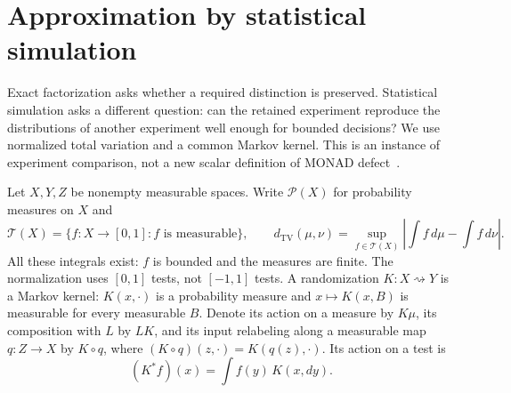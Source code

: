 \section{Approximation by statistical simulation}
\label{sec:simulation}

Exact factorization asks whether a required distinction is preserved.
Statistical simulation asks a different question: can the retained
experiment reproduce the distributions of another experiment well enough
for bounded decisions? We use normalized total variation and a common
Markov kernel. This is an instance of experiment comparison, not a new
scalar definition of MONAD defect~\cite{carterGaussianApproximation}.

Let $X,Y,Z$ be nonempty measurable spaces. Write $\mathcal P(X)$ for
probability measures on $X$ and
\[
 \mathcal T(X)=\{f:X\to[0,1]:f\text{ is measurable}\},\qquad
 d_{\mathrm{TV}}(\mu,\nu)
 =\sup_{f\in\mathcal T(X)}\left|\int f\,d\mu-\int f\,d\nu\right|.
\]
All these integrals exist: $f$ is bounded and the measures are finite.
The normalization uses $[0,1]$ tests, not $[-1,1]$ tests. A randomization
$K:X\rightsquigarrow Y$ is a Markov kernel: $K(x,\cdot)$ is a probability
measure and $x\mapsto K(x,B)$ is measurable for every measurable $B$.
Denote its action on a measure by $K\mu$, its composition with $L$ by
$LK$, and its input relabeling along a measurable map $q:Z\to X$ by
$K\circ q$, where $(K\circ q)(z,\cdot)=K(q(z),\cdot)$.
Its action on a test is
\[
 (K^*f)(x)=\int f(y)\,K(x,dy).
\]

